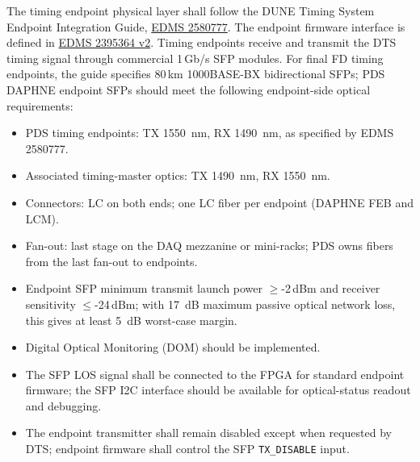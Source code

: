 The timing endpoint physical layer shall follow the DUNE Timing System Endpoint
Integration Guide, \href{https://edms.cern.ch/document/2580777}{EDMS 2580777}.
The endpoint firmware interface is defined in
\href{https://edms.cern.ch/document/2395364}{EDMS 2395364 v2}. Timing endpoints
receive and transmit the DTS timing signal through commercial 1\,Gb/s SFP modules.
For final FD timing endpoints, the guide specifies 80\,km 1000BASE-BX bidirectional
SFPs; PDS DAPHNE endpoint SFPs should meet the following endpoint-side optical
requirements:
\begin{itemize}[nosep]
  \item PDS timing endpoints: TX \SI{1550}{nm}, RX \SI{1490}{nm}, as specified by EDMS 2580777.
  \item Associated timing-master optics: TX \SI{1490}{nm}, RX \SI{1550}{nm}.
  \item Connectors: LC on both ends; one LC fiber per endpoint (DAPHNE FEB and LCM).
  \item Fan-out: last stage on the DAQ mezzanine or mini-racks; PDS owns fibers from the last fan-out to endpoints.
  \item Endpoint SFP minimum transmit launch power \(\ge\)-2\,dBm and receiver sensitivity \(\le\)-24\,dBm; with \SI{17}{dB} maximum passive optical network loss, this gives at least \SI{5}{dB} worst-case margin.

  \item Digital Optical Monitoring (DOM) should be implemented.
  \item The SFP LOS signal shall be connected to the FPGA for standard endpoint firmware; the SFP I2C interface should be available for optical-status readout and debugging.
  \item The endpoint transmitter shall remain disabled except when requested by DTS; endpoint firmware shall control the SFP \texttt{TX\_DISABLE} input.
\end{itemize}




